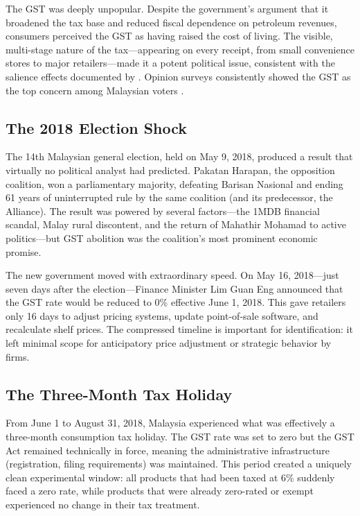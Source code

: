\documentclass[12pt]{article}
\begin{document}
The GST was deeply unpopular. Despite the government's argument that it broadened the tax base and reduced fiscal dependence on petroleum revenues, consumers perceived the GST as having raised the cost of living. The visible, multi-stage nature of the tax---appearing on every receipt, from small convenience stores to major retailers---made it a potent political issue, consistent with the salience effects documented by \citet{chetty2009}. Opinion surveys consistently showed the GST as the top concern among Malaysian voters \citep{welsh2018}.

\subsection{The 2018 Election Shock}

The 14th Malaysian general election, held on May 9, 2018, produced a result that virtually no political analyst had predicted. Pakatan Harapan, the opposition coalition, won a parliamentary majority, defeating Barisan Nasional and ending 61 years of uninterrupted rule by the same coalition (and its predecessor, the Alliance). The result was powered by several factors---the 1MDB financial scandal, Malay rural discontent, and the return of Mahathir Mohamad to active politics---but GST abolition was the coalition's most prominent economic promise.

The new government moved with extraordinary speed. On May 16, 2018---just seven days after the election---Finance Minister Lim Guan Eng announced that the GST rate would be reduced to 0\% effective June 1, 2018. This gave retailers only 16 days to adjust pricing systems, update point-of-sale software, and recalculate shelf prices. The compressed timeline is important for identification: it left minimal scope for anticipatory price adjustment or strategic behavior by firms.

\subsection{The Three-Month Tax Holiday}

From June 1 to August 31, 2018, Malaysia experienced what was effectively a three-month consumption tax holiday. The GST rate was set to zero but the GST Act remained technically in force, meaning the administrative infrastructure (registration, filing requirements) was maintained. This period created a uniquely clean experimental window: all products that had been taxed at 6\% suddenly faced a zero rate, while products that were already zero-rated or exempt experienced no change in their tax treatment.
\end{document}
